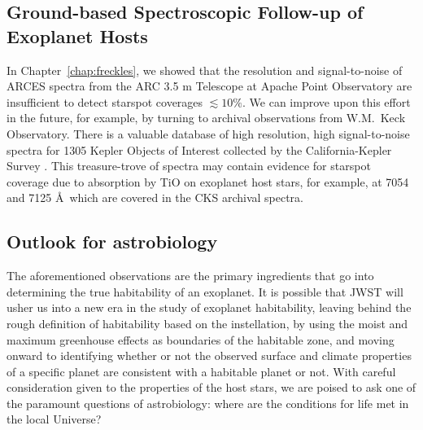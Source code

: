 \subsection{Ground-based Spectroscopic Follow-up of Exoplanet Hosts}

In Chapter~\ref{chap:freckles}, we showed that the resolution and signal-to-noise of ARCES spectra from the ARC 3.5 m Telescope at Apache Point Observatory are insufficient to detect starspot coverages $\lesssim10\%$. We can improve upon this effort in the future, for example, by turning to archival observations from W.M.~Keck Observatory. There is a valuable database of high resolution, high signal-to-noise spectra for 1305 Kepler Objects of Interest collected by the California-Kepler Survey \citep[CKS:][]{Petigura2017,Johnson2017}. This treasure-trove of spectra may contain evidence for starspot coverage due to absorption by TiO on exoplanet host stars, for example, at 7054 and 7125 \AA\ which are covered in the CKS archival spectra. 

\subsection{Outlook for astrobiology}

The aforementioned observations are the primary ingredients that go into determining the true habitability of an exoplanet. It is possible that JWST will usher us into a new era in the study of exoplanet habitability, leaving behind the rough definition of habitability based on the instellation, by using the moist and maximum greenhouse effects as boundaries of the habitable zone, and moving onward to identifying whether or not the observed surface and climate properties of a specific planet are consistent with a habitable planet or not. With careful consideration given to the properties of the host stars, we are poised to ask one of the paramount questions of astrobiology: where are the conditions for life met in the local Universe?
